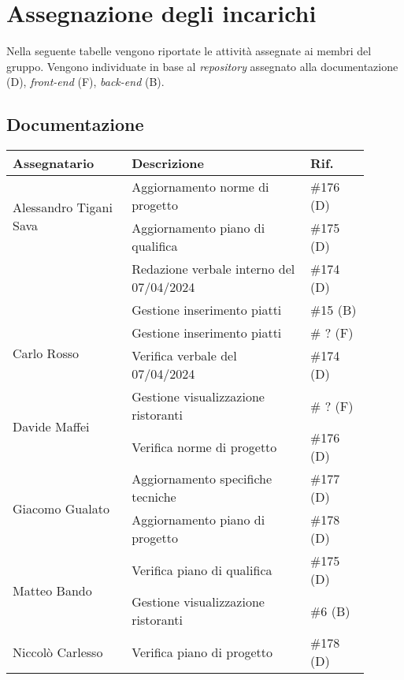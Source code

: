 \section{Assegnazione degli incarichi}
Nella seguente tabelle vengono riportate le attività assegnate ai membri del gruppo.
Vengono individuate in base al \textit{repository} assegnato alla documentazione (D), \textit{front-end} (F), \textit{back-end} (B).

\subsection{Documentazione}
\begin{center}
	{
		\renewcommand{\arraystretch}{1.5}
		\begin{tabular}{p{0.30\linewidth}|p{0.45\linewidth}|p{0.15\linewidth}}
			\textbf{Assegnatario}          			& \textbf{Descrizione}				& \textbf{Rif.} \\
			\hline
			\multirow{2}{*}{Alessandro Tigani Sava}	& Aggiornamento norme di progetto	& \#176 (D)	\\
			\cline{2-3}
													& Aggiornamento piano di qualifica	& \#175	(D)	\\
			\cline{2-3}
													& Redazione verbale interno del 07/04/2024	& \#174	(D)	\\
			\cline{2-3}
													& Gestione inserimento piatti		& \#15 (B)	\\
			\hline
			\multirow{2}{*}{Carlo Rosso}   			& Gestione inserimento piatti		& \# ? (F)	\\
			\cline{2-3}
			                               			& Verifica verbale del 07/04/2024	& \#174	(D)	\\
			\hline
			\multirow{2}{*}{Davide Maffei} 			& Gestione visualizzazione ristoranti	& \# ? (F)	\\
			\cline{2-3}
			                               			& Verifica norme di progetto		& \#176 (D)	\\
			\hline
			\multirow{2}{*}{Giacomo Gualato}		& Aggiornamento specifiche tecniche	& \#177 (D)	\\
			\cline{2-3}
			                               			& Aggiornamento piano di progetto	& \#178 (D)	\\
			\hline
			\multirow{2}{*}{Matteo Bando}  			& Verifica piano di qualifica		& \#175	(D)	\\
			\cline{2-3}
			                               			& Gestione visualizzazione ristoranti	& \#6 (B)	\\
			\hline
			Niccolò Carlesso               			& Verifica piano di progetto		& \#178 (D)	\\
			\hline
		\end{tabular}
	}
\end{center}
